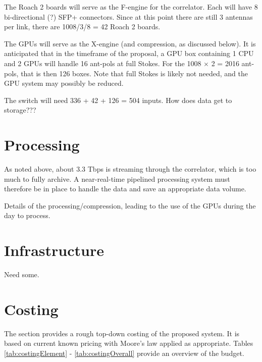 \documentclass[11pt]{article}
\begin{document}
The Roach 2 boards will serve as the F-engine for the correlator.  Each will
have 8 bi-directional (?) SFP+ connectors.  Since at this point there are still
3 antennas per link, there are 1008/3/8 = 42 Roach 2 boards.

The GPUs will serve as the X-engine (and compression, as discussed below).  It
is anticipated that in the timeframe of the proposal, a GPU box containing 1
CPU and 2 GPUs will handle 16 ant-pols at full Stokes.  For the 1008 $\times$ 2
= 2016 ant-pols, that is then 126 boxes.  Note that full Stokes is likely not
needed, and the GPU system may possibly be reduced.

The switch will need 336 + 42 + 126 = 504 inputs.  How does data get to
storage???

\section{Processing}

As noted above, about 3.3 Tbps is streaming through the correlator, which is
too much to fully archive.  A near-real-time pipelined processing system must
therefore be in place to handle the data and save an appropriate data volume.

Details of the processing/compression, leading to the use of the GPUs during the day to process.

\section{Infrastructure}
Need some.

\section{Costing}

The section provides a rough top-down costing of the proposed system.  It is
based on current known pricing with Moore's law applied as appropriate.  Tables
\ref{tab:costingElement} - \ref{tab:costingOverall} provide an overview of the
budget. 
\end{document}
